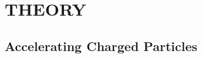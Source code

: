 \documentclass[a4paper,oneside,12pt]{report}
\numberwithin{equation}{chapter}
\begin{document}


\tableofcontents


\newcommand{\vecthreeBF}[1]{\vec{\textbf{#1}}}
\newcommand{\vecthree}[1]{\vec{#1}}
\newcommand{\vecNum}[3]{(#1, #2, #3)}

\newcommand{\parDeriv}[2]{\frac{\partial #1}{\partial #2}}
\newcommand{\parDerivS}[2]{\frac{\partial^2 #1}{\partial #2^2}}
\newcommand{\derivS}[2]{\frac{d^2 #1}{d#2^2}}

\newcommand{\dotProdBF}[2]{\vecthreeBF{#1} \cdot \vecthreeBF{#2}}
\newcommand{\dotProd}[2]{\vecthree{#1} \cdot \vecthree{#2}}

\newcommand{\crossProdBF}[2]{\vecthreeBF{#1} \times \vecthreeBF{#2}}
\newcommand{\crossProd}[2]{\vecthree{#1} \times \vecthree{#2}}

\newcommand{\e}{$\textbf{e}^-$}
\newcommand{\egun}{$\textbf{e}^-$-gun}
\newcommand{\eB}{$\textbf{e}^-$ - $\vecthreeBF{B}$ }
\newcommand{\eE}{$\textbf{e}^-$ - $\vecthreeBF{E}$ }
\newcommand{\eEM}{$\textbf{e}^-$ - \textbf{EM} }
\newcommand{\ee}{$\textbf{e}^-$ - $\textbf{e}^-$ }


\newcommand{\fromeq}[1]{\textit{equation \ref{eq:#1}}}
\newcommand{\fromeqs}[2]{\textit{equations \ref{eq:#1} and \ref{eq:#2}}}
\newcommand{\fromeqsth}[3]{\textit{equations \ref{eq:#1}, \ref{eq:#2} and \ref{eq:#3}}}

\newcommand{\fromfig}[1]{\textit{figure \ref{fig:#1}}}
\newcommand{\fromfigs}[2]{\textit{figures \ref{fig:#1} and \ref{fig:#2}}}

\newcommand{\fromsec}[1]{\textit{section \ref{sec:#1}}}
\newcommand{\fromsecs}[2]{\textit{sections \ref{sec:#1} and \ref{sec:#2}}}

\newcommand{\fromapp}[1]{\textit{Appendix \ref{appendix:#1}}}

\newcommand{\fromtab}[1]{\textit{Table \ref{tab:#1}}}
\newcommand{\fromtabs}[2]{\textit{Tables \ref{tab:#1} and \ref{tab:#2}}}%

\chapter{THEORY}

\section{Accelerating Charged Particles}
\end{document}
